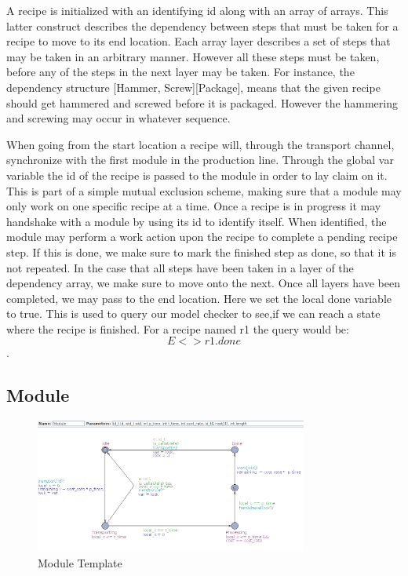 A recipe is initialized with an identifying id along with an array of arrays. This latter construct describes the dependency between steps that must be taken for a recipe to move to its end location. Each array layer describes a set of steps that may be taken in an arbitrary manner. However all these steps must be taken, before any of the steps in the next layer may be taken. For instance, the dependency structure [Hammer, Screw][Package], means that the given recipe should get hammered and screwed before it is packaged. However the hammering and screwing may occur in whatever sequence. 

When going from the start location a recipe will, through the transport channel, synchronize with the first module in the production line.  Through the global var variable the id of the recipe is passed to the module in order to lay claim on it. This is part of a simple mutual exclusion scheme, making sure that a module may only work on one specific recipe at a time. Once a recipe is in progress it may handshake with a module by using its id to identify itself. When identified, the module may perform a work action upon the recipe to complete a pending recipe step. If this is done, we make sure to mark the finished step as done, so that it is not repeated. In the case that all steps have been taken in a layer of the dependency array, we make sure to move onto the next. Once all layers have been completed,  we may pass to the end location. Here we set the local done variable to true. This is used to query our model checker to see,if we can reach a state where the recipe is finished. For a recipe named r1 the query would be: \[E<> r1.done\].

\subsection{Module}

\begin{figure}
\centering
\includegraphics[width=0.8\textwidth]{images/firstmodule.png}
\caption{Module Template}
\label{fig:firstmodule}
\end{figure}

